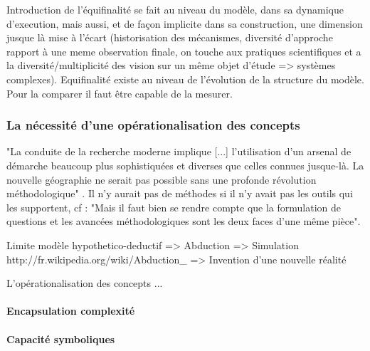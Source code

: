 {Introduction de l'équifinalité se fait au niveau du modèle, dans sa dynamique d'execution, mais aussi, et de façon implicite dans sa construction, une dimension jusque là mise à l'écart (historisation des mécanismes, diversité d'approche rapport à une meme observation finale, on touche aux pratiques scientifiques et a la diversité/multiplicité des vision sur un même objet d'étude => systèmes complexes). Equifinalité existe au niveau de l'évolution de la structure du modèle. Pour la comparer il faut être capable de la mesurer.








\subsubsection{La nécessité d'une opérationalisation des concepts}

"La conduite de la recherche moderne implique [...] l'utilisation d'un arsenal de démarche beaucoup plus sophistiquées et diverses que celles connues jusque-là. La nouvelle géographie ne serait pas possible sans une profonde révolution méthodologique" \autocite[p27]{Claval1977}. Il n'y aurait pas de méthodes si il n'y avait pas les outils qui les supportent, cf \autocite{Gould1970} \autocite{Gould2004} : "Mais il faut bien se rendre compte que la formulation de questions et les avancées méthodologiques sont les deux faces d'une même pièce".

Limite modèle hypothetico-deductif => Abduction  => Simulation 
http://fr.wikipedia.org/wiki/Abduction_%
=> Invention d'une nouvelle réalité 

L'opérationalisation des concepts ...

\paragraph{Encapsulation complexité}

\paragraph{Capacité symboliques}

}
